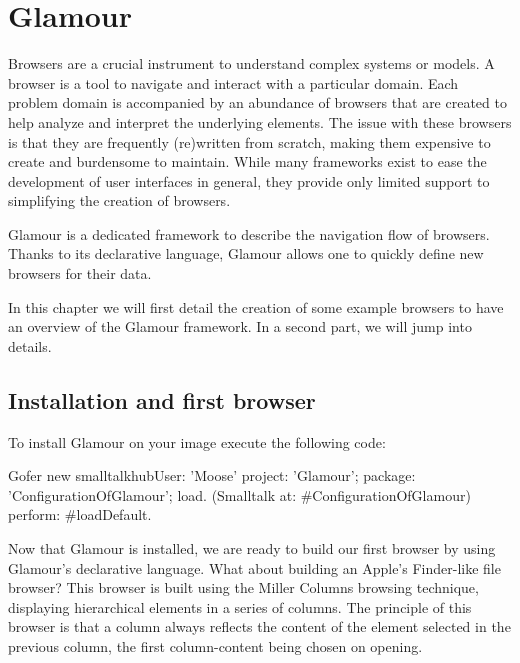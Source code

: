 \documentclass[a4paper,10pt,twoside]{book}
\begin{document}
\fi
\sloppy
\chapter{Glamour}

Browsers are a crucial instrument to understand complex systems or
models. A browser is a tool to navigate and interact with a particular domain.
Each problem domain is accompanied by an abundance of browsers
that are created to help analyze and interpret the underlying
elements. The issue with these browsers is that they are frequently
(re)written from scratch, making them expensive to create and burdensome
to maintain. While many frameworks exist to ease the development of
user interfaces in general, they provide only limited support to
simplifying the creation of browsers.

Glamour is a dedicated framework to describe the navigation flow
of browsers. Thanks to its declarative language, Glamour allows one to
quickly define new browsers for their data.

In this chapter we will first detail the creation of some example
browsers to have an overview of the Glamour framework. In a second
part, we will jump into details.

\section{Installation and first browser}
\label{sec:inst-first-brows}

To install Glamour on your \pharo{} image execute the following code:

\begin{code}{}
Gofer new
  smalltalkhubUser: 'Moose' project: 'Glamour'; 
  package: 'ConfigurationOfGlamour';
  load.
(Smalltalk at: #ConfigurationOfGlamour) perform: #loadDefault.
\end{code}

Now that Glamour is installed, we are ready to build our first browser by using Glamour's declarative language. 
What about building an Apple's Finder-like file browser? This browser is built
using the Miller Columns browsing technique, displaying hierarchical
elements in a series of columns. The principle of this browser is
that a column always reflects the content of the element selected in
the previous column, the first column-content being chosen on opening.
\end{document}
